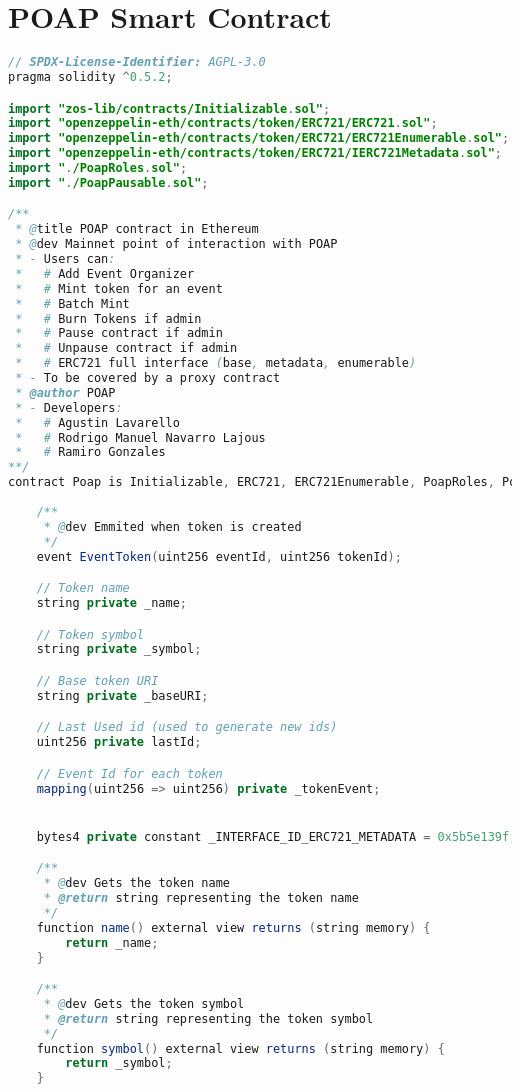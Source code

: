 \documentclass[MSE,Master,english]{twbook}%
\begin{document}
\chapter{POAP Smart Contract}
\begin{lstlisting}[language=Java, name={POAP Smart Contract}, label={sc:poapContract}]
// SPDX-License-Identifier: AGPL-3.0
pragma solidity ^0.5.2;

import "zos-lib/contracts/Initializable.sol";
import "openzeppelin-eth/contracts/token/ERC721/ERC721.sol";
import "openzeppelin-eth/contracts/token/ERC721/ERC721Enumerable.sol";
import "openzeppelin-eth/contracts/token/ERC721/IERC721Metadata.sol";
import "./PoapRoles.sol";
import "./PoapPausable.sol";

/**
 * @title POAP contract in Ethereum
 * @dev Mainnet point of interaction with POAP
 * - Users can:
 *   # Add Event Organizer
 *   # Mint token for an event
 *   # Batch Mint
 *   # Burn Tokens if admin
 *   # Pause contract if admin
 *   # Unpause contract if admin
 *   # ERC721 full interface (base, metadata, enumerable)
 * - To be covered by a proxy contract
 * @author POAP
 * - Developers:
 *   # Agustin Lavarello
 *   # Rodrigo Manuel Navarro Lajous
 *   # Ramiro Gonzales
**/
contract Poap is Initializable, ERC721, ERC721Enumerable, PoapRoles, PoapPausable {
   
    /**
     * @dev Emmited when token is created
     */
    event EventToken(uint256 eventId, uint256 tokenId);

    // Token name
    string private _name;

    // Token symbol
    string private _symbol;

    // Base token URI
    string private _baseURI;

    // Last Used id (used to generate new ids)
    uint256 private lastId;

    // Event Id for each token
    mapping(uint256 => uint256) private _tokenEvent;


    bytes4 private constant _INTERFACE_ID_ERC721_METADATA = 0x5b5e139f;

    /**
     * @dev Gets the token name
     * @return string representing the token name
     */
    function name() external view returns (string memory) {
        return _name;
    }

    /**
     * @dev Gets the token symbol
     * @return string representing the token symbol
     */
    function symbol() external view returns (string memory) {
        return _symbol;
    }


\end{lstlisting}
\end{document}
